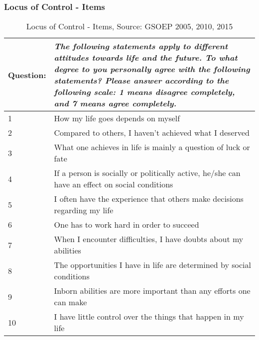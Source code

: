 \documentclass{beamer}
\begin{document}
\begin{frame}[c]\frametitle{Locus of Control - Items}

\begin{table}[H]\tiny
    \begin{tabular}{p{1.5cm} p{8cm}}
    \toprule
    Question: & \textit{The following statements apply to different attitudes
    towards life and the future. To what degree to you personally agree with
    the following statements? Please answer according to the following scale: 1
    means disagree completely, and 7 means agree completely.} \\
    \midrule
    1  & How my life goes depends on myself \\
    2  & Compared to others, I haven't achieved what I deserved \\
    3  & What one achieves in life is mainly a question of luck or fate \\
    4  & If a person is socially or politically active, he/she can have an effect on social conditions \\
    5  & I often have the experience that others make decisions regarding my life \\
    6  & One has to work hard in order to succeed \\
    7  & When I encounter difficulties, I have doubts about my abilities \\
    8  & The opportunities I have in life are determined by social conditions \\
    9  & Inborn abilities are more important than any efforts one can make \\
    10 & I have little control over the things that happen in my life \\
    \bottomrule
    \end{tabular}
    \caption{Locus of Control - Items, Source: GSOEP 2005, 2010, 2015}
    \label{tab:loc_items}
\end{table}


\end{frame}
\end{document}
